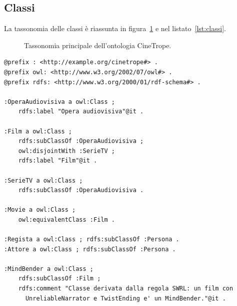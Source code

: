 \documentclass[a4paper,11pt]{article}
\newcommand{\code}[1]{\texttt{#1}}
\begin{document}
\subsection{Classi}

La tassonomia delle classi \`e riassunta in
figura~\ref{fig:classLists} e nel listato~\ref{lst:classi}.

\begin{figure}[ht]
\centering
{}
\caption{Tassonomia principale dell'ontologia CineTrope.}
\label{fig:classLists}
\end{figure}

\begin{lstlisting}[style=ttl, caption={Frammento di
\code{data/ontology/cinetrope.ttl}: classi principali.}, label={lst:classi}]
@prefix : <http://example.org/cinetrope#> .
@prefix owl: <http://www.w3.org/2002/07/owl#> .
@prefix rdfs: <http://www.w3.org/2000/01/rdf-schema#> .

:OperaAudiovisiva a owl:Class ;
    rdfs:label "Opera audiovisiva"@it .

:Film a owl:Class ;
    rdfs:subClassOf :OperaAudiovisiva ;
    owl:disjointWith :SerieTV ;
    rdfs:label "Film"@it .

:SerieTV a owl:Class ;
    rdfs:subClassOf :OperaAudiovisiva .

:Movie a owl:Class ;
    owl:equivalentClass :Film .

:Regista a owl:Class ; rdfs:subClassOf :Persona .
:Attore a owl:Class ; rdfs:subClassOf :Persona .

:MindBender a owl:Class ;
    rdfs:subClassOf :Film ;
    rdfs:comment "Classe derivata dalla regola SWRL: un film con
      UnreliableNarrator e TwistEnding e' un MindBender."@it .
\end{lstlisting}
\end{document}
